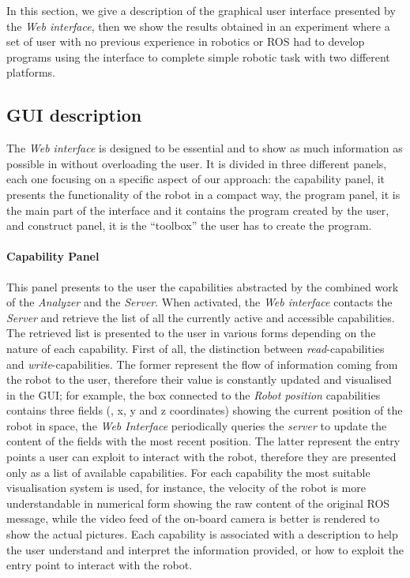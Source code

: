 In this section, we give a description of the graphical user interface presented by the \textit{Web interface}, then we show the results obtained in an experiment where a set of user with no previous experience in robotics or ROS had to develop programs using the interface to complete simple robotic task with two different platforms.

\subsection{GUI description}
The \textit{Web interface} is designed to be essential and to show as much information as possible in without overloading the user. It is divided in three different panels, each one focusing on a specific aspect of our approach: the capability panel, it presents the functionality of the robot in a compact way, the program panel, it is the main part of the interface and it contains the program created by the user, and construct panel, it is the ``toolbox'' the user has to create the program.

\paragraph{Capability Panel} This panel presents to the user the capabilities abstracted by the combined work of the \textit{Analyzer} and the \textit{Server}. When activated, the \textit{Web interface} contacts the \textit{Server} and retrieve the list of all the currently active and accessible capabilities. The retrieved list is presented to the user in various forms depending on the nature of each capability. First of all, the distinction between \textit{read}-capabilities and \textit{write}-capabilities. The former represent the flow of information coming from the robot to the user, therefore their value is constantly updated and visualised in the GUI; for example, the box connected to the \textit{Robot position} capabilities contains three fields (\ie, x, y and z coordinates) showing the current position of the robot in space, the \textit{Web Interface} periodically queries the \textit{server} to update the content of the fields with the most recent position. The latter represent the entry points a user can exploit to interact with the robot, therefore they are presented only as a list of available capabilities. For each capability the most suitable visualisation system is used, for instance, the velocity of the robot is more understandable in numerical form showing the raw content of the original ROS message, while the video feed of the on-board camera is better is rendered to show the actual pictures. Each capability is associated with a description to help the user understand and interpret the information provided, or how to exploit the entry point to interact with the robot.

